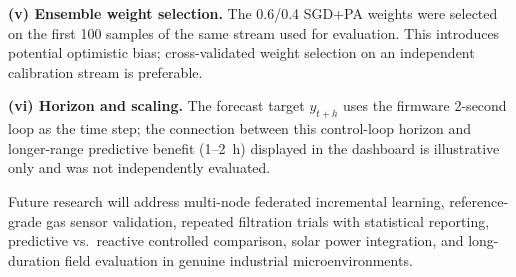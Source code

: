 \textbf{(v) Ensemble weight selection.} The 0.6/0.4 SGD+PA weights were selected on the
first 100 samples of the same stream used for evaluation. This introduces potential
optimistic bias; cross-validated weight selection on an independent calibration stream
is preferable.

\textbf{(vi) Horizon and scaling.} The forecast target $y_{t+h}$ uses the firmware
2-second loop as the time step; the connection between this control-loop horizon and
longer-range predictive benefit (1--2~h) displayed in the dashboard is illustrative only
and was not independently evaluated.

Future research will address multi-node federated incremental learning, reference-grade
gas sensor validation, repeated filtration trials with statistical reporting, predictive
vs.\ reactive controlled comparison, solar power integration, and long-duration field
evaluation in genuine industrial microenvironments.
